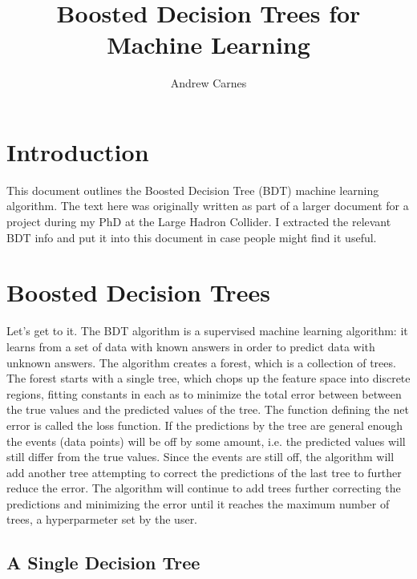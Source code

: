 \documentclass[12pt]{article}
\begin{document}
\title{Boosted Decision Trees for Machine Learning}
\author{Andrew Carnes}

\maketitle 

\newpage
\tableofcontents
\newpage

\section{Introduction}

This document outlines the Boosted Decision Tree (BDT) machine learning algorithm. The text here was originally written as part of a larger document for a project during my PhD at the Large Hadron Collider. I extracted the relevant BDT info and put it into this document in case people might find it useful. 

\section{Boosted Decision Trees}

Let's get to it. The BDT algorithm is a supervised machine learning algorithm: it learns from a set of data with known answers in order to predict data with unknown answers. The algorithm creates a forest, which is a collection of trees. The forest starts with a single tree, which chops up the feature space into discrete regions, fitting constants in each as to minimize the total error between between the true values and the predicted values of the tree. The function defining the net error is called the loss function. If the predictions by the tree are general enough the events (data points) will be off by some amount, i.e. the predicted values will still differ from the true values. Since the events are still off, the algorithm will add another tree attempting to correct the predictions of the last tree to further reduce the error. The algorithm will continue to add trees further correcting the predictions and minimizing the error until it reaches the maximum number of trees, a hyperparmeter set by the user.

\subsection{A Single Decision Tree}
\end{document}
